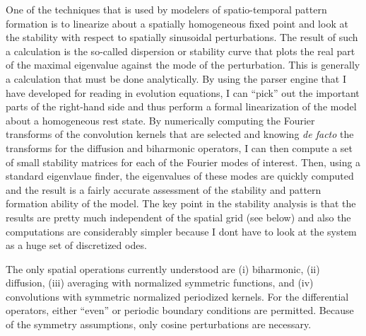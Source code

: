 One of the techniques that is used by modelers of spatio-temporal
pattern formation is to linearize about a spatially homogeneous fixed
point and look at the stability with respect to spatially sinusoidal
perturbations.  The result of such a calculation is the so-called
dispersion or stability curve that plots the real part of the maximal
eigenvalue against the mode of the perturbation.  This is generally a
calculation that must be done analytically.  By using the parser
engine that I have developed for reading in evolution equations, I can
``pick'' out the important parts of the right-hand side and thus
perform a formal linearization of the model about a homogeneous rest
state.  By numerically computing the Fourier transforms of the
convolution kernels that are selected and knowing {\em de facto} the
transforms for the diffusion and biharmonic operators, I can then
compute a set of small stability matrices for each of the Fourier
modes of interest.  Then, using a standard eigenvlaue finder, the
eigenvalues of these modes are quickly computed and the result is a
fairly accurate assessment of the stability and pattern formation
ability of the model.  The key point in the stability analysis is that
the results are pretty much independent of the spatial grid (see
below) and also the computations are considerably simpler because I
dont have to look at the system as a huge set of discretized odes.

The only spatial operations currently understood are (i) biharmonic,
(ii) diffusion, (iii) averaging with normalized symmetric functions, and (iv)
convolutions with symmetric normalized periodized kernels.  For the
differential operators, either ``even'' or periodic boundary
conditions are permitted.  Because of the symmetry assumptions, only
cosine perturbations are necessary. 

